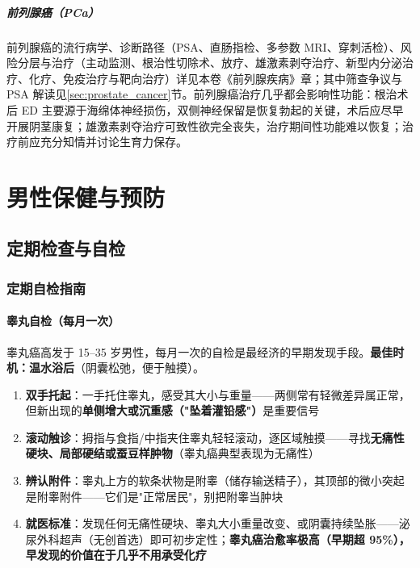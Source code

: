\documentclass[12pt,a4paper,twoside]{ctexbook}
\begin{document}
\subsubsection{前列腺癌（PCa）}
前列腺癌的流行病学、诊断路径（PSA、直肠指检、多参数 MRI、穿刺活检）、风险分层与治疗（主动监测、根治性切除术、放疗、雄激素剥夺治疗、新型内分泌治疗、化疗、免疫治疗与靶向治疗）详见本卷《前列腺疾病》章；其中筛查争议与 PSA 解读见\ref{sec:prostate_cancer}节。前列腺癌治疗几乎都会影响性功能：根治术后 ED 主要源于海绵体神经损伤，双侧神经保留是恢复勃起的关键，术后应尽早开展阴茎康复；雄激素剥夺治疗可致性欲完全丧失，治疗期间性功能难以恢复；治疗前应充分知情并讨论生育力保存。

\part{男性保健与预防}

\chapter{定期检查与自检}

\section{定期自检指南}


\subsection{睾丸自检（每月一次）}


睾丸癌高发于 15--35 岁男性，每月一次的自检是最经济的早期发现手段。\textbf{最佳时机：温水浴后}（阴囊松弛，便于触摸）。

\begin{enumerate}
	\item \textbf{双手托起}：一手托住睾丸，感受其大小与重量——两侧常有轻微差异属正常，但新出现的\textbf{单侧增大或沉重感（"坠着灌铅感"）}是重要信号
	\item \textbf{滚动触诊}：拇指与食指/中指夹住睾丸轻轻滚动，逐区域触摸——寻找\textbf{无痛性硬块、局部硬结或蚕豆样肿物}（睾丸癌典型表现为无痛性）
	\item \textbf{辨认附件}：睾丸上方的软条状物是附睾（储存输送精子），其顶部的微小突起是附睾附件——它们是"正常居民"，别把附睾当肿块
	\item \textbf{就医标准}：发现任何无痛性硬块、睾丸大小重量改变、或阴囊持续坠胀——泌尿外科超声（无创首选）即可初步定性；\textbf{睾丸癌治愈率极高（早期超 95\%），早发现的价值在于几乎不用承受化疗}
\end{enumerate}
\end{document}
